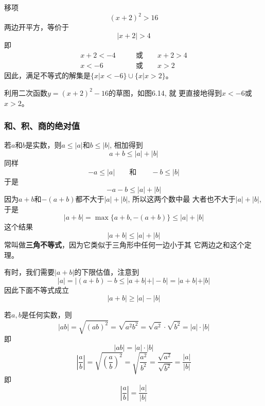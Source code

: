 \begin{solution}
    移项
\[(x+2)^2>16\]
    两边开平方，等价于
    \[|x+2|>4\]
    即
    \[\begin{split}
        x+2<-4\qquad &\text{或}\qquad x+2>4\\  x<-6\qquad &\text{或}\qquad x>2
    \end{split}\]
因此，满足不等式的解集是$\{x|x<-6\}\cup\{x|x>2\}$。

利用二次函数$y=(x+2)^2-16$的草图，如图6.14, 就
更直接地得到$x<-6$或$x>2$。
\begin{figure}[htp]
    \centering
{}

    \caption{}
\end{figure}
\end{solution}

\subsubsection{和、积、商的绝对值}
若$a$和$b$是实数，则$a\le |a|$和$b\le |b|$, 相加得到
\[a+b\le  |a|+|b|\]
同样
\[-a\le |a|\qquad \text{和}\qquad -b\le |b|\]
于是
\[-a-b\le |a|+|b|\]
因为$a+b$和$-(a+b)$都不大于$|a|+|b|$, 所以这两个数中最
大者也不大于$|a|+|b|$, 于是
\[|a+b|=\max\{a+b,-(a+b)\}\le |a|+|b|\]
这个结果
\begin{equation}
    |a+b|\le |a|+|b|
\end{equation}
常叫做\textbf{三角不等式}，因为它类似于三角形中任何一边小于其
它两边之和这个定理。

有时，我们需要$|a+b|$的下限估值，注意到
\[|a|=|(a+b)-b\le |a+b| +|-b| =|a+b| +|b|\]
因此下面不等式成立
\begin{equation}
    |a+b|\ge |a|-|b|
\end{equation}

若$a,b$是任何实数，则
\[|ab|=\sqrt{(ab)^2}=\sqrt{a^2b^2}=\sqrt{a^2}\cdot \sqrt{b^2}=|a|\cdot |b|\]
即
\begin{equation}
    |ab|=|a|\cdot |b|
\end{equation}
\[\left|\frac{a}{b}\right|=\sqrt{\left(\frac{a}{b}\right)^2}=\sqrt{\frac{a^2}{b^2}}=\frac{\sqrt{a^2}}{\sqrt{b^2}}=\frac{|a|}{|b|}\]
即
\begin{equation}
    \left|\frac{a}{b}\right|=\frac{|a|}{|b|}
\end{equation}

